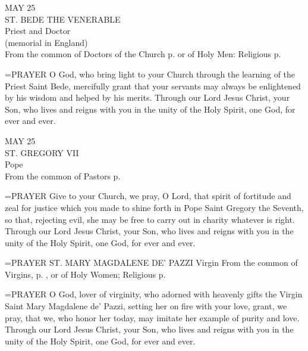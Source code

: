 \begin{center}\normalsize MAY 25\\
\footnotesize ST. BEDE THE VENERABLE\\
\footnotesize Priest and Doctor\\
\footnotesize (memorial in England)\\
\footnotesize From the common of Doctors of the Church p.   or of Holy Men: Religious p. \\
\end{center}

\hangindent=\parindent \small{PRAYER 
O God, who bring light to your Church
through the learning of the Priest Saint Bede,
mercifully grant that your servants
may always be enlightened by his wisdom and helped by his merits.
Through our Lord Jesus Christ, your Son,
who lives and reigns with you in the unity of the Holy Spirit,
one God, for ever and ever.\\}
 
\begin{center}\normalsize MAY 25\\
\footnotesize ST. GREGORY VII\\
\footnotesize Pope\\
\footnotesize From the common of Pastors p. \\
\end{center}

\hangindent=\parindent \small{PRAYER 
Give to your Church, we pray, O Lord,
that spirit of fortitude and zeal for justice
which you made to shine forth in Pope Saint Gregory the Seventh,
so that, rejecting evil, she may be free
to carry out in charity whatever is right.
Through our Lord Jesus Christ, your Son,
who lives and reigns with you in the unity of the Holy Spirit,
one God, for ever and ever.\\}
 
\hangindent=\parindent \small{PRAYER 
ST. MARY MAGDALENE DE’ PAZZI
Virgin
From the common of Virgins, p.    , or of Holy Women; Religious p. \\}
 
\hangindent=\parindent \small{PRAYER 
O God, lover of virginity,
who adorned with heavenly gifts
the Virgin Saint Mary Magdalene de’ Pazzi,
setting her on fire with your love,
grant, we pray, that we, who honor her today,
may imitate her example of purity and love.
Through our Lord Jesus Christ, your Son,
who lives and reigns with you in the unity of the Holy Spirit,
one God, for ever and ever.\\}
 
